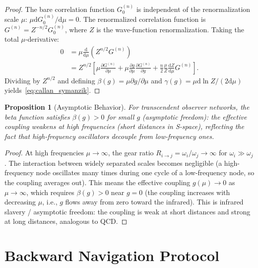 \documentclass[11pt,twocolumn,a4paper]{article}
\newtheorem{proposition}[theorem]{Proposition}
\theoremstyle{definition}
\newcommand{\dif}{\mathrm{d}}
\newcommand{\Rij}{R_{i \to j}}
\begin{document}
\begin{proof}
The bare correlation function $G_0^{(n)}$ is independent of the renormalization scale $\mu$:
$\mu \dif G_0^{(n)} / \dif\mu = 0$. The renormalized correlation function is
$G^{(n)} = Z^{-n/2} G_0^{(n)}$, where $Z$ is the wave-function renormalization. Taking the
total $\mu$-derivative:
\begin{align}
  0 &= \mu \frac{\dif}{\dif\mu}(Z^{n/2} G^{(n)}) \nonumber \\
    &= Z^{n/2}\left[\mu\frac{\partial G^{(n)}}{\partial\mu}
       + \mu\frac{\partial g}{\partial\mu}\frac{\partial G^{(n)}}{\partial g}
       + \frac{n}{2}\frac{\mu}{Z}\frac{\dif Z}{\dif\mu} G^{(n)}\right].
\end{align}
Dividing by $Z^{n/2}$ and defining $\beta(g) = \mu\partial g/\partial\mu$ and
$\gamma(g) = \mu \dif\ln Z / (2\dif\mu)$ yields~\eqref{eq:callan_symanzik}.
\end{proof}

\begin{proposition}[Asymptotic Behavior]\label{prop:asymptotic}
For transcendent observer networks, the beta function satisfies $\beta(g) > 0$ for
small $g$ (asymptotic freedom): the effective coupling weakens at high frequencies
(short distances in S-space), reflecting the fact that high-frequency oscillators
decouple from low-frequency ones.
\end{proposition}

\begin{proof}
At high frequencies $\mu \to \infty$, the gear ratio $\Rij = \omega_i/\omega_j \to \infty$
for $\omega_i \gg \omega_j$. The interaction between widely separated scales becomes
negligible (a high-frequency node oscillates many times during one cycle of a
low-frequency node, so the coupling averages out). This means the effective coupling
$g(\mu) \to 0$ as $\mu \to \infty$, which requires $\beta(g) > 0$ near $g = 0$
(the coupling increases with decreasing $\mu$, i.e., $g$ flows away from zero toward
the infrared). This is infrared slavery / asymptotic freedom: the coupling is weak at
short distances and strong at long distances, analogous to QCD.
\end{proof}


\section{Backward Navigation Protocol}\label{sec:backward}
\end{document}
